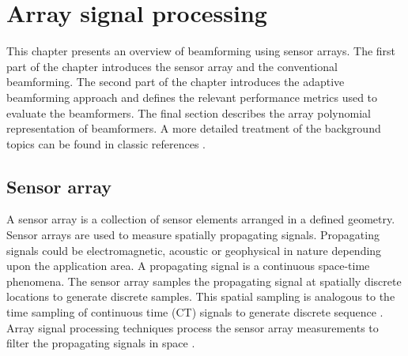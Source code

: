 \chapter{Array signal processing}
\label{ch:lit-rev}
This chapter presents an overview of beamforming using sensor
arrays. The first part of the chapter introduces the sensor array and
the conventional beamforming. The second part of the chapter
introduces the adaptive beamforming approach and defines the relevant
performance metrics used to evaluate the beamformers. The final
section describes the array polynomial representation of
beamformers. A more detailed treatment of the background topics can be
found in classic references \cite{vtree2002oap,johnson1992array}.

\section{Sensor array}
\label{sec:sensor_array} 
A sensor array is a collection of sensor elements arranged in a
defined geometry. Sensor arrays are used to measure spatially
propagating signals. Propagating signals could be electromagnetic,
acoustic or geophysical in nature depending upon the application
area. A propagating signal is a continuous space-time phenomena. The
sensor array samples the propagating signal at spatially discrete
locations to generate discrete samples. This spatial sampling is
analogous to the time sampling of continuous time (CT) signals to
generate discrete sequence \cite{Oppenheim1989}. Array signal
processing techniques process the sensor array measurements to filter
the propagating signals in space \cite{johnson1992array, vtree2002oap}.


